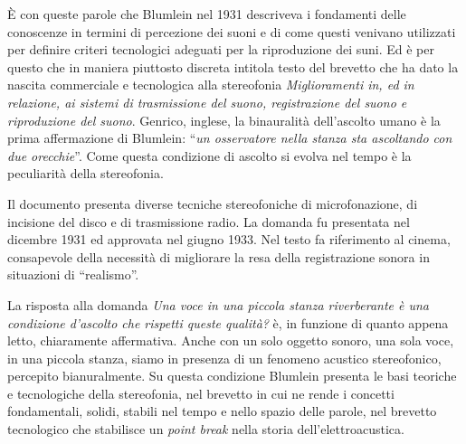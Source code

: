 È con queste parole che Blumlein nel 1931 descriveva i fondamenti delle conoscenze
in termini di percezione dei suoni e di come questi venivano utilizzati per definire
criteri tecnologici adeguati per la riproduzione dei suni. Ed è per questo che
in maniera piuttosto discreta intitola testo del brevetto che ha dato la nascita
commerciale e tecnologica alla stereofonia \emph{Miglioramenti in, ed in relazione,
ai sistemi di trasmissione del suono, registrazione del suono e riproduzione del suono}.
Genrico, inglese, la binauralità dell'ascolto umano è la prima affermazione di
Blumlein: “\emph{un osservatore nella stanza sta ascoltando con due orecchie}”.
Come questa condizione di ascolto si evolva nel tempo è la peculiarità della
stereofonia.

Il documento presenta diverse tecniche stereofoniche di microfonazione, di
incisione del disco e di trasmissione radio. La domanda fu presentata nel
dicembre 1931 ed approvata nel giugno 1933. Nel testo fa riferimento al cinema,
consapevole della necessità di migliorare la resa della registrazione sonora
in situazioni di “realismo”.

La risposta alla domanda \emph{Una voce in una piccola stanza riverberante è una
condizione d'ascolto che rispetti queste qualità?} è, in funzione di quanto
appena letto, chiaramente affermativa. Anche con un solo oggetto sonoro,
una sola voce, in una piccola stanza, siamo in
presenza di un fenomeno acustico stereofonico, percepito bianuralmente. Su questa
condizione Blumlein presenta le basi teoriche e tecnologiche della stereofonia,
nel brevetto in cui ne rende i concetti fondamentali, solidi,
stabili nel tempo e nello spazio delle parole, nel brevetto tecnologico che stabilisce
un \emph{point break} nella storia dell'elettroacustica.
